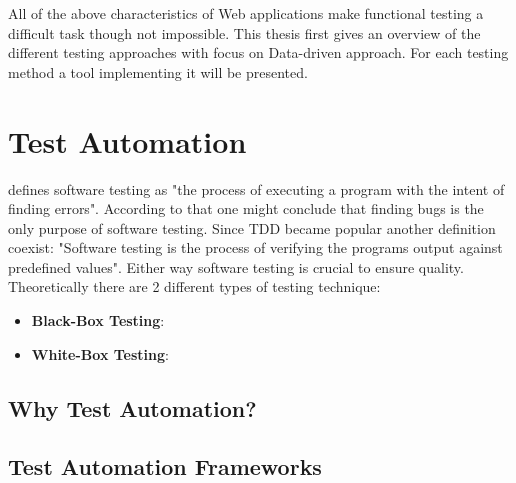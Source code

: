 \documentclass[12pt, notitlepage]{article}
\begin{document}
All of the above characteristics of Web applications make functional testing a difficult task though not impossible.
This thesis first gives an overview of the different testing approaches with focus on Data-driven approach. For each 
testing method a tool implementing it will be presented. 


\section{Test Automation}
\cite{art-of-software-testing} defines software testing as "the process of executing a program with the intent of finding errors".
According to that one might conclude that finding bugs is the only purpose of software testing. Since TDD\cite{tdd} became popular
another definition coexist: "Software testing is the process of verifying the programs output against predefined values". 
Either way software testing is crucial to ensure quality. \\
Theoretically there are 2 different types of testing technique\cite{art-of-software-testing}:
\begin{itemize}

	\item \textbf{Black-Box Testing}: 

	\item \textbf{White-Box Testing}: 

\end{itemize}

\subsection{Why Test Automation?}

\subsection{Test Automation Frameworks}
\end{document}
